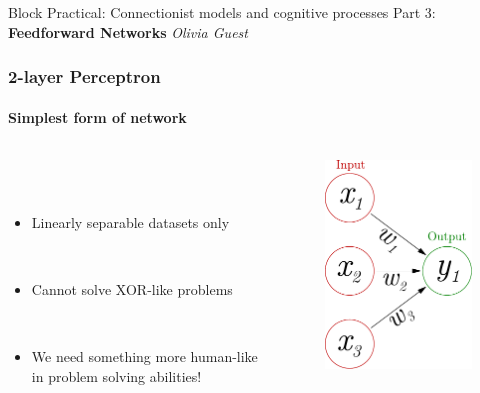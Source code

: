 \documentclass{beamer}
\newcommand{\figheight}{0.72\textheight}
\begin{document}
\begin{frame}[fragile]

\centering\Huge Block Practical: Connectionist models and cognitive processes
\vfill \huge
\centering Part 3: \textbf{Feedforward Networks} \large
\vfill
\textit{
Olivia Guest }

\end{frame}


\begin{frame}[fragile]
\frametitle{2-layer Perceptron}
\framesubtitle{Simplest form of network}
 \begin{columns}[T]
    \begin{column}{.45\textwidth} 
        \  \\
 \   \\ 
\begin{itemize}
\item Linearly separable datasets only

\ \\

 \item Cannot solve XOR-like problems
 
 \ \\
 
\item We need something more human-like in problem solving abilities! 
\end{itemize}
\end{column}
\begin{column}{.55\textwidth}
\begin{figure}[t]
 \begin{flushleft}

  \includegraphics[height = \figheight]{./fig/perceptron_maths.pdf}

 \end{flushleft}
\end{figure}
\end{column}

\end{columns}

\end{frame}
\end{document}
